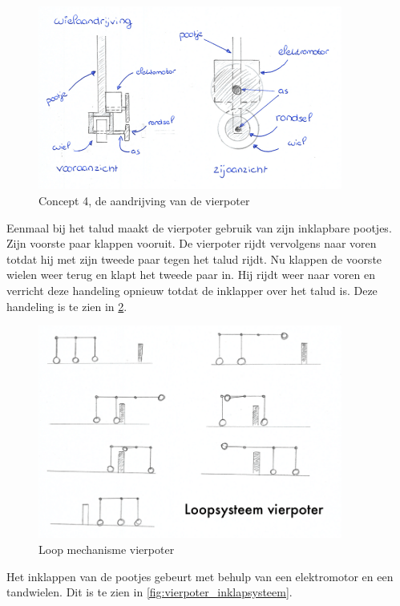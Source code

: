 \begin{figure}[H]
    \includegraphics[width = 100mm]{04_idee_ontwikkeling/Foto_aandrijving_vierpoter.PNG}
    \caption{Concept 4, de aandrijving van de vierpoter}
    \label{fig:vierpoter_aandrijving}
\end{figure}

\vspace{\baselineskip}
Eenmaal bij het talud maakt de vierpoter gebruik van zijn inklapbare pootjes. Zijn voorste paar klappen vooruit. De vierpoter rijdt vervolgens naar voren totdat hij met zijn tweede paar tegen het talud rijdt. Nu klappen de voorste wielen weer terug en klapt het tweede paar in. Hij rijdt weer naar voren en verricht deze handeling opnieuw totdat de inklapper over het talud is. Deze handeling is te zien in \cref{fig:vierpoter_loopmechanisme}.\\

\begin{figure}[h]
    \includegraphics[width = 100mm]{04_idee_ontwikkeling/Foto_loopsysteem.PNG}
    \caption{Loop mechanisme vierpoter}
    \label{fig:vierpoter_loopmechanisme}
\end{figure}

Het inklappen van de pootjes gebeurt met behulp van een elektromotor en een tandwielen. Dit is te zien in \cref{fig:vierpoter_inklapsysteem}.\\

